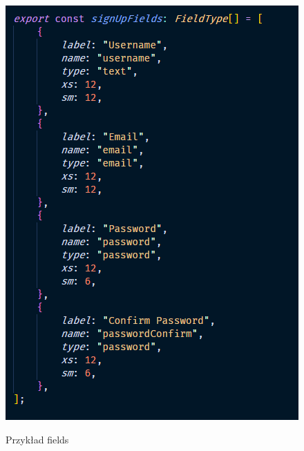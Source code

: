 \documentclass[a4paper,11pt]{report}
\begin{document}
\begin{figure}[H]
	\centering
	\includegraphics[scale=0.5]{implementacja/frontend/fields}\\
	\caption{Przykład fields}
	\label{fig:fields}
\end{figure}
\end{document}
